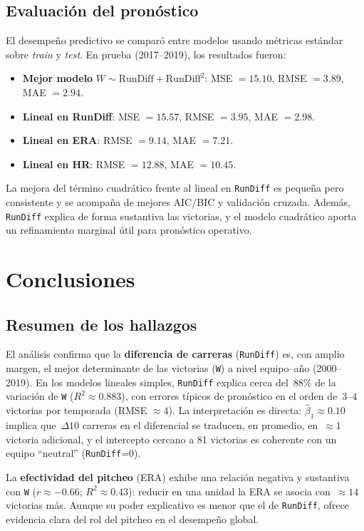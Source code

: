 \documentclass[10pt]{article}
\begin{document}
\subsection{Evaluación del pronóstico}
El desempeño predictivo se comparó entre modelos usando métricas estándar sobre \emph{train} y \emph{test}.
En prueba (2017–2019), los resultados fueron:
\begin{itemize}
    \item \textbf{Mejor modelo} \(W \sim \text{RunDiff} + \text{RunDiff}^2\): MSE \(=15.10\), RMSE \(=3.89\), MAE \(=2.94\).
    \item \textbf{Lineal en RunDiff}: MSE \(=15.57\), RMSE \(=3.95\), MAE \(=2.98\).
    \item \textbf{Lineal en ERA}: RMSE \(=9.14\), MAE \(=7.21\).
    \item \textbf{Lineal en HR}: RMSE \(=12.88\), MAE \(=10.45\).
\end{itemize}
La mejora del término cuadrático frente al lineal en \texttt{RunDiff} es pequeña pero consistente
y se acompaña de mejores AIC/BIC y validación cruzada. Además, \texttt{RunDiff} explica de forma sustantiva las victorias, y el modelo cuadrático aporta un 
refinamiento marginal útil para pronóstico operativo.
\section{Conclusiones}
\subsection{Resumen de los hallazgos}
El análisis confirma que la \textbf{diferencia de carreras} (\texttt{RunDiff}) es, con amplio margen, el mejor determinante de las victorias (\texttt{W}) a nivel equipo–año (2000–2019). En los modelos lineales simples, \texttt{RunDiff} explica cerca del \(\,88\%\) de la variación de \texttt{W} (\(R^2\approx0.883\)), con errores típicos de pronóstico en el orden de \(\,3\text{--}4\) victorias por temporada (RMSE \(\approx 4\)). La interpretación es directa: \(\hat\beta_1\approx 0.10\) implica que \(\,\Delta 10\) carreras en el diferencial se traducen, en promedio, en \(\,\approx 1\) victoria adicional, y el intercepto cercano a 81 victorias es coherente con un equipo ``neutral'' (\texttt{RunDiff}=0).

La \textbf{efectividad del pitcheo} (ERA) exhibe una relación negativa y sustantiva con \texttt{W} (\(r\approx -0.66\); \(R^2\approx 0.43\)): reducir en una unidad la ERA se asocia con \(\,\approx 14\) victorias más. Aunque su poder explicativo es menor que el de \texttt{RunDiff}, ofrece evidencia clara del rol del pitcheo en el desempeño global.
\end{document}
